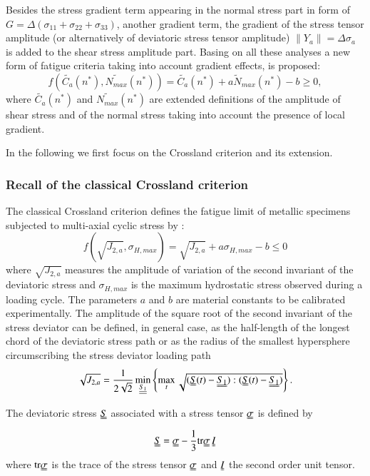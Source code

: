 \documentclass[3p,times,procedia,number]{elsarticle}
\begin{document}
Besides the stress gradient term appearing in the normal stress part in form of $G=\Delta(\sigma_{11}+\sigma_{22}+\sigma_{33})$, another gradient term, the gradient of the stress tensor amplitude (or alternatively of deviatoric stress tensor amplitude) $\parallel{Y}_a\parallel={\Delta\sigma}_a$ is added to the shear stress amplitude part. Basing on all these analyses a new form of fatigue criteria taking into account gradient effects, is proposed:
\begin{equation}
f(\widetilde{C_a}(n^*),\widetilde{N_{max}}(n^*))=\widetilde{C_a}(n^*)+a\widetilde{N}_{max}(n^*)-b\geqslant 0 ,
\label{eq:gradient crossland}
\end{equation}
where $\widetilde{C_a}(n^*)$ and $\widetilde{N_{max}}(n^*)$ are extended definitions of the amplitude of shear stress and of the normal stress taking into account the presence of local gradient.

In the following we first focus on the Crossland criterion and its extension.

\subsubsection{Recall of the classical Crossland criterion}

The classical Crossland criterion defines the fatigue limit of metallic specimens subjected to multi-axial cyclic stress\cite{Crossland} by : 
\begin{equation}
f(\sqrt{J_{2,a}},\sigma_{H,max})=\sqrt{J_{2,a}}+a\sigma_{H,max}-b\leqslant 0\label{eq:crossland}
\end{equation}
where $\sqrt{J_{2,a}}$ measures  the amplitude of variation of the second invariant of the deviatoric stress  and $\sigma_{H,max}$ is the maximum hydrostatic stress observed during a loading cycle. The parameters $a$ and $b$ are material constants to be calibrated experimentally. The amplitude of the square root of the second invariant of the stress deviator can be defined, in general case, as the half-length of the longest chord of the deviatoric stress path or as the radius of the smallest hypersphere circumscribing the stress deviator loading path \cite{Papadopoulos1997219}
\begin{equation}\sqrt{J_{2,a}}=\dfrac{1}{2\sqrt{2}}\min \limits_{\uline{\uline{S_1}}}\left\lbrace \max \limits_{t}\sqrt{(\uuline{S}(t)-\uuline{S_1}):(\uuline{S}(t)-\uuline{S_1})}\right\rbrace . \end{equation}

The deviatoric stress $\uuline{S}$ associated with a stress tensor $\uuline{\sigma}$  is defined by
\begin{equation} \uuline{S}=\uuline{\sigma}-\dfrac{1}{3}\textrm{tr}\uuline{\sigma}\, \uuline{I}
\end{equation}
where $\textrm{tr}\uuline{\sigma}$ is the trace of the stress tensor $\uuline{\sigma}$ and $\uuline{I}$ the second order unit tensor.
\end{document}
